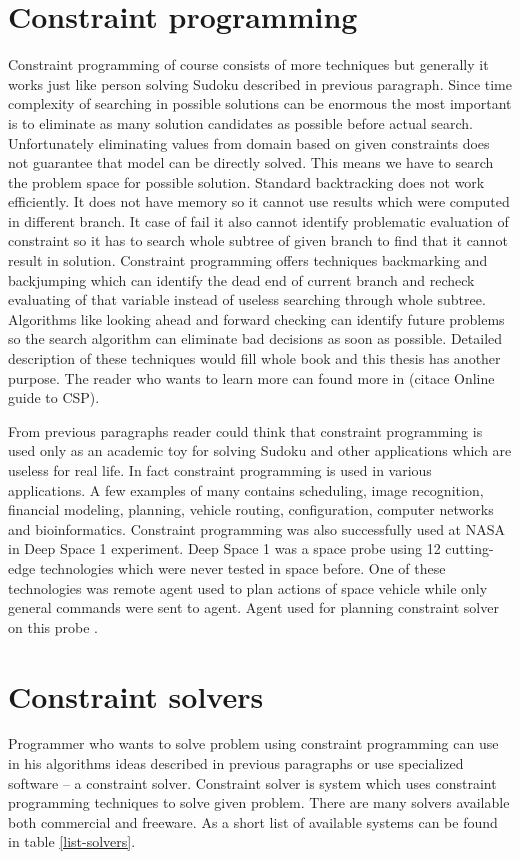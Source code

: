 \section{Constraint programming}
Constraint programming of course consists of more techniques but generally it works just like person solving Sudoku described in previous paragraph. Since time complexity of searching in possible solutions can be enormous the most important is to eliminate as many solution candidates as possible before actual search. Unfortunately eliminating values from domain based on given constraints does not guarantee that model can be directly solved. This means we have to search the problem space for possible solution. Standard backtracking does not work efficiently. It does not have memory so it cannot use results which were computed in different branch. It case of fail it also cannot identify problematic evaluation of constraint so it has to search whole subtree of given branch to find that it cannot result in solution. Constraint programming offers techniques backmarking and backjumping which can identify the dead end of current branch and recheck evaluating of that variable instead of useless searching through whole subtree. Algorithms like looking ahead and forward checking can identify future problems so the search algorithm can eliminate bad decisions as soon as possible. Detailed description of these techniques would fill whole book and this thesis has another purpose. The reader who wants to learn more can found more in (citace Online guide to CSP).

From previous paragraphs reader could think that constraint programming is used only as an academic toy for solving Sudoku and other applications which are useless for real life. In fact constraint programming is used in various applications. A few examples of many contains scheduling, image recognition, financial modeling, planning, vehicle routing, configuration, computer networks and bioinformatics. Constraint programming was also successfully used at NASA in Deep Space 1 experiment. Deep Space 1 was a space probe using 12 cutting-edge technologies which were never tested in space before. One of these technologies was remote agent used to plan actions of space vehicle while only general commands were sent to agent. Agent used for planning constraint solver on this probe \cite{nasa:ds1-ara}.

\section{Constraint solvers}
Programmer who wants to solve problem using constraint programming can use in his algorithms ideas described in previous paragraphs or use specialized software -- a constraint solver. Constraint solver is system which uses constraint programming techniques to solve given problem. There are many solvers available both commercial and freeware. As a short list of available systems can be found in table  \ref{list-solvers}.

